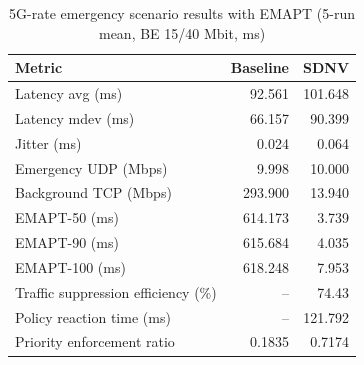 \begin{table}[t]
\caption{5G-rate emergency scenario results with EMAPT (5-run mean, BE 15/40 Mbit, ms)}
\label{tab:5g-emergency-emapt}
\centering
\begin{tabular}{lrr}
\hline
Metric & Baseline & SDNV \\
\hline
Latency avg (ms) & 92.561 & 101.648 \\
Latency mdev (ms) & 66.157 & 90.399 \\
Jitter (ms) & 0.024 & 0.064 \\
Emergency UDP (Mbps) & 9.998 & 10.000 \\
Background TCP (Mbps) & 293.900 & 13.940 \\
EMAPT-50 (ms) & 614.173 & 3.739 \\
EMAPT-90 (ms) & 615.684 & 4.035 \\
EMAPT-100 (ms) & 618.248 & 7.953 \\
Traffic suppression efficiency (\%) & -- & 74.43 \\
Policy reaction time (ms) & -- & 121.792 \\
Priority enforcement ratio & 0.1835 & 0.7174 \\
\hline
\end{tabular}
\end{table}
